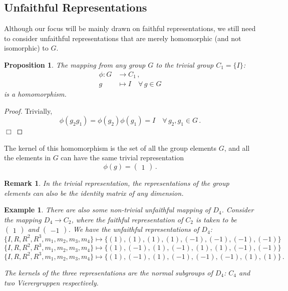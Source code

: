 \documentclass{article}
\theoremstyle{plain}\theoremheaderfont{\normalfont\itshape}\theorembodyfont{\rmfamily}\theoremseparator{.}\newtheorem*{rem}{Remark}\newtheorem*{ex}{Example}\newtheorem*{proof}{Proof}\newtheorem*{altp}{Alternative proof}
\theoremstyle{plain}\theoremheaderfont{\normalfont\bfseries}\theorembodyfont{\rmfamily}\theoremseparator{.}\newtheorem{thm}{Theorem}[section]\newtheorem{lem}[thm]{Lemma}\newtheorem{prop}[thm]{Proposition}\newtheorem*{cor}{Corollary}\newtheorem{defn}[thm]{Definition}\newtheorem{clm}[thm]{Claim}\newtheorem{clminproof}{Claim}
\theoremstyle{break}\theoremheaderfont{\normalfont\itshape}\theorembodyfont{\rmfamily}\theoremseparator{.\medskip}\newtheorem*{proofskip}{Proof}\newtheorem*{exs}{Examples}\newtheorem*{rems}{Remarks}
\theoremstyle{break}\theoremheaderfont{\normalfont\bfseries}\theorembodyfont{\rmfamily}\theoremseparator{.\medskip}\newtheorem{lemskip}[thm]{Lemma}\newtheorem{defnskip}[thm]{Definition}\newtheorem{propskip}[thm]{Proposition}\newtheorem{thmskip}[thm]{Theorem}
\numberwithin{equation}{section}
\newcommand{\qed}{\hfill\ensuremath{\Box}}
\begin{document}
	\subsection{Unfaithful Representations}
	Although our focus will be mainly drawn on faithful representations, we still need to consider unfaithful representations that are merely homomorphic (and not isomorphic) to \(G\).
	\begin{prop}
		The mapping from any group \(G\) to the trivial group \(C_1=\{I\}\):
		\begin{align*}
			\phi:G&\to C_1\,,\\
			g&\mapsto I\quad\forall\,g\in G
		\end{align*}
		is a homomorphism.
	\end{prop}
	\begin{proof}
		Trivially,
		\[\phi(g_2g_1)=\phi(g_2)\phi(g_1)=I\quad\forall\,g_2,g_1\in G\,.\]\qed
	\end{proof}
	The kernel of this homomorphism is the set of all the group elements \(G\), and all the elements in \(G\) can have the same trivial representation
	\[\phi(g)=\begin{pmatrix}
		1
	\end{pmatrix}\,.\]
	\begin{rem}
		In the trivial representation, the representations of the group elements can also be the identity matrix of any dimension.
	\end{rem}
	\begin{ex}
		There are also some non-trivial unfaithful mapping of \(D_4\). Consider the mapping \(D_4\to C_2\), where the faithful representation of \(C_2\) is taken to be \(\begin{pmatrix}
			1
		\end{pmatrix}\) and \(\begin{pmatrix}
			-1
		\end{pmatrix}\). We have the unfaithful representations of \(D_4\):
		\[\{I,R,R^2,R^3,m_1,m_2,m_3,m_4\}\mapsto\{(1),(1),(1),(1),(-1),(-1),(-1),(-1)\}\]
		\[\{I,R,R^2,R^3,m_1,m_2,m_3,m_4\}\mapsto\{(1),(-1),(1),(-1),(1),(1),(-1),(-1)\}\]
		\[\{I,R,R^2,R^3,m_1,m_2,m_3,m_4\}\mapsto\{(1),(-1),(1),(-1),(-1),(-1),(1),(1)\}\,.\]

		The kernels of the three representations are the normal subgroups of \(D_4\): \(C_4\) and two Vierergruppen respectively.
	\end{ex}
	
\end{document}
